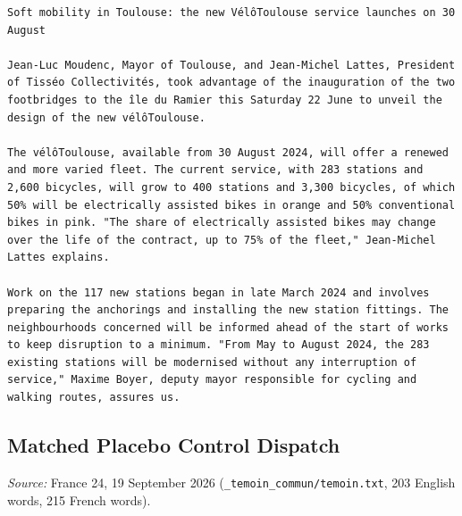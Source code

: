 \begin{Verbatim}
Soft mobility in Toulouse: the new VélôToulouse service launches on 30 August

Jean-Luc Moudenc, Mayor of Toulouse, and Jean-Michel Lattes, President of Tisséo Collectivités, took advantage of the inauguration of the two footbridges to the île du Ramier this Saturday 22 June to unveil the design of the new vélôToulouse.

The vélôToulouse, available from 30 August 2024, will offer a renewed and more varied fleet. The current service, with 283 stations and 2,600 bicycles, will grow to 400 stations and 3,300 bicycles, of which 50% will be electrically assisted bikes in orange and 50% conventional bikes in pink. "The share of electrically assisted bikes may change over the life of the contract, up to 75% of the fleet," Jean-Michel Lattes explains.

Work on the 117 new stations began in late March 2024 and involves preparing the anchorings and installing the new station fittings. The neighbourhoods concerned will be informed ahead of the start of works to keep disruption to a minimum. "From May to August 2024, the 283 existing stations will be modernised without any interruption of service," Maxime Boyer, deputy mayor responsible for cycling and walking routes, assures us.
\end{Verbatim}

\subsection{Matched Placebo Control Dispatch}

\emph{Source:} France 24, 19 September 2026 (\texttt{\_temoin\_commun/temoin.txt}, 203 English words, 215 French words).

